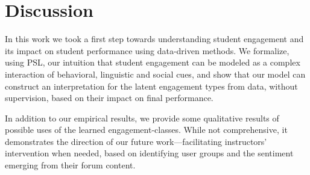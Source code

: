\section{Discussion}
\label{sec:disc}
In this work we took a first step towards understanding student engagement and its impact on student performance using data-driven methods. We formalize, using PSL, our intuition that student engagement can be modeled as a complex interaction of behavioral, linguistic and social cues, and show that our model can construct an interpretation for the latent engagement types from data, without supervision, based on their impact on final performance. 

In addition to our empirical results, we provide some qualitative results of possible uses of the learned engagement-classes. While not comprehensive, it demonstrates the direction of our future work---facilitating instructors' intervention when needed, based on identifying user groups and the sentiment emerging from their forum content.



